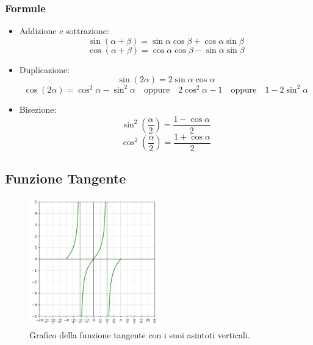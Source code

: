 \documentclass[oneside,10pt]{book} %
\begin{document}
\subsubsection{Formule}
\begin{itemize}
    \item Addizione e sottrazione:
    \[
      \sin(\alpha+\beta) = \sin\alpha \cos\beta + \cos\alpha \sin\beta
    \]
    \[
      \cos(\alpha+\beta) = \cos\alpha \cos\beta - \sin\alpha \sin\beta
    \]
\end{itemize}
\begin{itemize}
    \item Duplicazione:
    \[
      \sin(2\alpha) = 2 \sin\alpha \cos\alpha
    \]
    \[
      \cos(2\alpha) = \cos^2\alpha - \sin^2\alpha \quad \text{oppure} \quad 2\cos^2\alpha - 1 \quad \text{oppure} \quad 1 - 2\sin^2\alpha
    \]
\end{itemize}
\begin{itemize}
    \item Bisezione:
    \[
      \sin^2\left(\frac{\alpha}{2}\right) = \frac{1 - \cos\alpha}{2}
    \]
    \[
      \cos^2\left(\frac{\alpha}{2}\right) = \frac{1 + \cos\alpha}{2}
    \]
\end{itemize}

\subsection{Funzione Tangente}

\begin{figure}[H]
    \centering
    \includegraphics[width=0.5\textwidth]{./img/tangente.png}
    \caption{Grafico della funzione tangente con i suoi asintoti verticali.}
    \label{fig:tangente}
\end{figure}
\FloatBarrier
\end{document}
